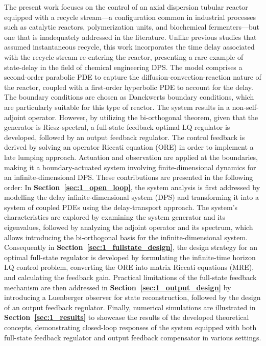 The present work focuses on the control of an axial dispersion tubular reactor equipped with a recycle stream—a configuration common in industrial processes such as catalytic reactors, polymerization units, and biochemical fermenters—but one that is inadequately addressed in the literature. Unlike previous studies that assumed instantaneous recycle, this work incorporates the time delay associated with the recycle stream re-entering the reactor, presenting a rare example of state-delay in the field of chemical engineering DPS. The model comprises a second-order parabolic PDE to capture the diffusion-convection-reaction nature of the reactor, coupled with a first-order hyperbolic PDE to account for the delay. The boundary conditions are chosen as Danckwerts boundary conditions, which are particularly suitable for this type of reactor. The system results in a non-self-adjoint operator. However, by utilizing the bi-orthogonal theorem, given that the generator is Riesz-spectral, a full-state feedback optimal LQ regulator is developed, followed by an output feedback regulator. The control feedback is derived by solving an operator Riccati equation (ORE) in order to implement a late lumping approach. Actuation and observation are applied at the boundaries, making it a boundary-actuated system involving finite-dimensional dynamics for an infinite-dimensional DPS. These contributions are presented in the following order: In \textbf{Section~\ref{sec:1_open_loop}}, the system analysis is first addressed by modelling the delay infinite-dimensional system (DPS) and transforming it into a system of coupled PDEs using the delay-transport approach. The system's characteristics are explored by examining the system generator and its eigenvalues, followed by analyzing the adjoint operator and its spectrum, which allows introducing the bi-orthogonal basis for the infinite-dimensional system. Consequently in \textbf{Section~\ref{sec:1_fullstate_design}}, the design strategy for an optimal full-state regulator is developed by formulating the infinite-time horizon LQ control problem, converting the ORE into matrix Riccati equations (MRE), and calculating the feedback gain. Practical limitations of the full-state feedback mechanism are then addressed in \textbf{Section~\ref{sec:1_output_design}} by introducing a Luenberger observer for state reconstruction, followed by the design of an output feedback regulator. Finally, numerical simulations are illustrated in \textbf{Section~\ref{sec:1_results}} to showcase the results of the developed theoretical concepts, demonstrating closed-loop responses of the system equipped with both full-state feedback regulator and output feedback compensator in various settings.